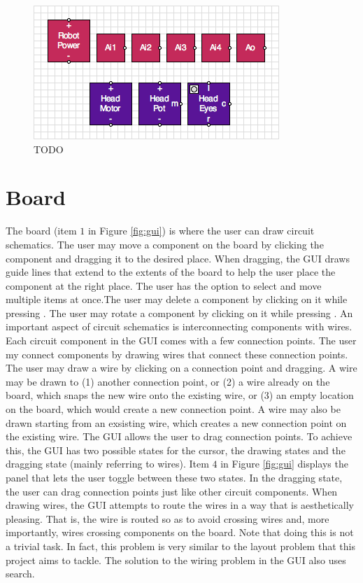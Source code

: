 \begin{figure}
\begin{center}
\includegraphics[scale=0.75]{Images/robot_head_parts.png}
\caption{TODO}
\label{fig:robot_head_parts}
\end{center}
\end{figure}

\section{Board}

The board (item $1$ in Figure \ref{fig:gui}) is where the user can draw circuit
schematics. The user may move a component on the board by clicking the component
and dragging it to the desired place. When dragging, the GUI draws guide lines
that extend to the extents of the board to help the user place the component
at the right place. The user has the option to select and move multiple items at
once.The user may delete a component by clicking on it while
pressing . The user may rotate a component by clicking on it
while pressing . An important aspect of circuit schematics is
interconnecting components with wires. Each circuit component in the GUI comes
with a few connection points. The user my connect components by drawing wires
that connect these connection points. The user may draw a wire by clicking on a
connection point and dragging. A wire may be drawn to (1) another connection
point, or (2) a wire already on the board, which snaps the new wire onto the
existing wire, or (3) an empty location on the board, which would create a new
connection point. A wire may also be drawn starting from an exsisting wire,
which creates a new connection point on the existing wire. The GUI allows the
user to drag connection points. To achieve this, the GUI has two possible
states for the cursor, the drawing states and the dragging state (mainly
referring to wires). Item $4$ in Figure \ref{fig:gui} displays the panel that
lets the user toggle between these two states. In the dragging state, the user
can drag connection points just like other circuit components.
When drawing wires,
the GUI attempts to route the wires in a way that is aesthetically pleasing.
That is, the wire is routed so as to avoid crossing wires and, more importantly,
wires crossing components on the board. Note that doing this is not a trivial
task. In fact, this problem is very similar to the layout problem that this
project aims to tackle. The solution to the wiring problem in the GUI also uses
search.

